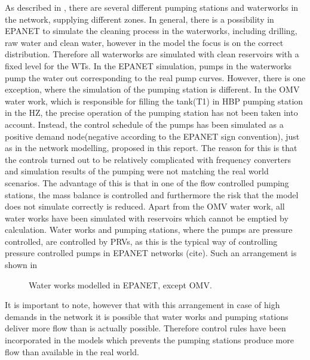 As described in , there are several different pumping stations and waterworks in the network, supplying different zones. In general, there is a possibility in EPANET to simulate the cleaning process in the waterworks, including drilling, raw water and clean water, however in the model the focus is on the correct distribution. Therefore all waterworks are simulated with clean reservoirs with a fixed level for the WTs. In the EPANET simulation, pumps in the waterworks pump the water out corresponding to the real pump curves. However, there is one exception, where the simulation of the pumping station is different. In the OMV water work, which is responsible for filling the tank(T1) in HBP pumping station in the HZ, the precise operation of the pumping station has not been taken into account. Instead, the control schedule of the pumps has been simulated as a positive demand node(negative according to the EPANET sign convention), just as in the network modelling, proposed in this report. The reason for this is that the controls turned out to be relatively complicated with frequency converters and simulation results of the pumping were not matching the real world scenarios. The advantage of this is that in one of the flow controlled pumping stations, the mass balance is controlled and furthermore the risk that the model does not simulate correctly is reduced. 
Apart from the OMV water work, all water works have been simulated with reservoirs which cannot be emptied by calculation. Water works and pumping stations, where the pumps are pressure controlled, are controlled by PRVs, as this is the typical way of controlling pressure controlled pumps in EPANET networks (cite). Such an arrangement is shown in  

\begin{figure}[H]
\centering
 
\caption{Water works modelled in EPANET, except OMV.}
\label{fig:PRV_EPANET}
\end{figure}

It is important to note, however that with this arrangement in case of high demands in the network it is possible that water works and pumping stations deliver more flow than is actually possible. Therefore control rules have been incorporated in the models which prevents the pumping stations produce more flow than available in the real world. 

